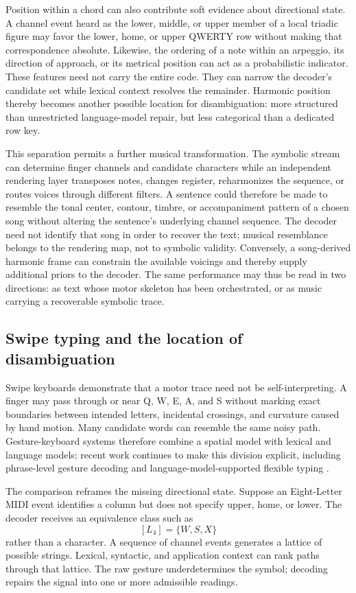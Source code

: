\documentclass[11pt]{article}
\begin{document}
Position within a chord can also contribute soft evidence about directional state. A channel event heard as the lower, middle, or upper member of a local triadic figure may favor the lower, home, or upper QWERTY row without making that correspondence absolute. Likewise, the ordering of a note within an arpeggio, its direction of approach, or its metrical position can act as a probabilistic indicator. These features need not carry the entire code. They can narrow the decoder's candidate set while lexical context resolves the remainder. Harmonic position thereby becomes another possible location for disambiguation: more structured than unrestricted language-model repair, but less categorical than a dedicated row key.

This separation permits a further musical transformation. The symbolic stream can determine finger channels and candidate characters while an independent rendering layer transposes notes, changes register, reharmonizes the sequence, or routes voices through different filters. A sentence could therefore be made to resemble the tonal center, contour, timbre, or accompaniment pattern of a chosen song without altering the sentence's underlying channel sequence. The decoder need not identify that song in order to recover the text; musical resemblance belongs to the rendering map, not to symbolic validity. Conversely, a song-derived harmonic frame can constrain the available voicings and thereby supply additional priors to the decoder. The same performance may thus be read in two directions: as text whose motor skeleton has been orchestrated, or as music carrying a recoverable symbolic trace.

\subsection{Swipe typing and the location of disambiguation}

Swipe keyboards demonstrate that a motor trace need not be self-interpreting. A finger may pass through or near Q, W, E, A, and S without marking exact boundaries between intended letters, incidental crossings, and curvature caused by hand motion. Many candidate words can resemble the same noisy path. Gesture-keyboard systems therefore combine a spatial model with lexical and language models; recent work continues to make this division explicit, including phrase-level gesture decoding and language-model-supported flexible typing \cite{xu2022,ma2025}.

The comparison reframes the missing directional state. Suppose an Eight-Letter MIDI event identifies a column but does not specify upper, home, or lower. The decoder receives an equivalence class such as
\[
[L_4]=\{W,S,X\}
\]
rather than a character. A sequence of channel events generates a lattice of possible strings. Lexical, syntactic, and application context can rank paths through that lattice. The raw gesture underdetermines the symbol; decoding repairs the signal into one or more admissible readings.
\end{document}
